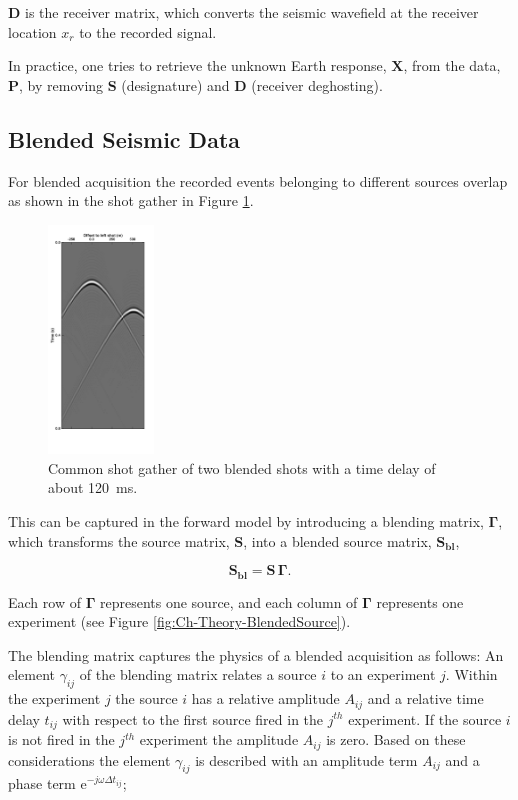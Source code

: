 $\mathbf{D}$ is the receiver matrix, which converts the seismic wavefield at the receiver location $x_r$ to the recorded signal.

In practice, one tries to retrieve the unknown Earth response, $\mathbf{X}$, from the data, $\mathbf{P}$, by removing $\mathbf{S}$ (designature) and $\mathbf{D}$ (receiver deghosting).

\subsection{Blended Seismic Data}

For blended acquisition the recorded events belonging to different sources overlap as shown in the shot gather in Figure \ref{fig:Ch-Theory-BlendedData}. 

\begin{figure}
	\centering
	\includegraphics[width=0.25\textwidth]{Plots/Mahdad/30iter/BlendedCSG_sh1-edit_copy}
	\caption{Common shot gather of two blended shots with a time delay of about \SI{120}{\milli\second}.}
	\label{fig:Ch-Theory-BlendedData}
\end{figure}

This can be captured in the forward model by introducing a blending matrix, $\mathbf{\Gamma}$, which transforms the source matrix, $\mathbf{S}$, into a blended source matrix, $\mathbf{S_{bl}}$,

\begin{equation}
	\mathbf{S_{bl}} = \mathbf{S \, \Gamma}.
	\label{eq:Ch-Theory-BlendedSource}
\end{equation}

 Each row of $\mathbf{\Gamma}$ represents one source, and each column of $\mathbf{\Gamma}$ represents one experiment (see Figure \ref{fig:Ch-Theory-BlendedSource}). 
 
 The blending matrix captures the physics of a blended acquisition as follows: An element $\gamma_{ij}$ of the blending matrix relates a source $i$ to an experiment $j$. Within the experiment $j$ the source $i$ has a relative amplitude $A_{ij}$ and a relative time delay $t_{ij}$ with respect to the first source fired in the $j^{th}$ experiment. If the source $i$ is not fired in the $j^{th}$ experiment the amplitude $A_{ij}$ is zero. Based on these considerations the element $\gamma_{ij}$ is described with an amplitude term $A_{ij}$ and a phase term $\mathrm{e}^{-j \omega \Delta t_{ij}}$; 


